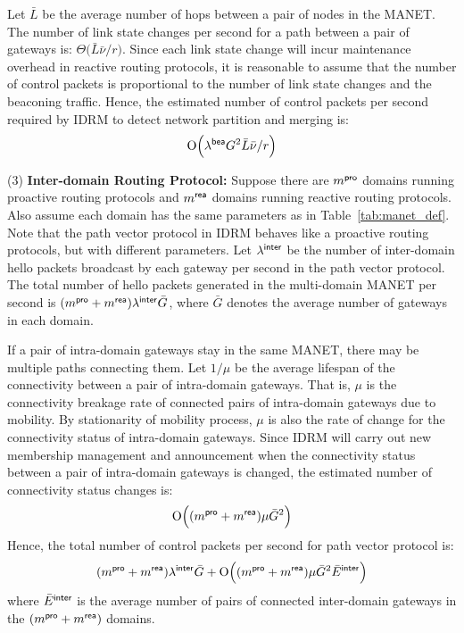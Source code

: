 Let $\bar{L}$ be the average number of hops between a pair of nodes in the MANET. The number of link state changes per second for a path between a pair of gateways is: 
$\Theta \big(\bar{L} \bar{\nu}\slash r\big)$.
Since each link state change will incur maintenance overhead in
reactive routing protocols, it is reasonable to assume that the number
of control packets is proportional to the number of link state changes and
the beaconing traffic.  Hence, the estimated number of control packets
per second required by IDRM to detect network partition and merging is: %
\begin{equation} \label{eq:rea-oh} 
{\rm O}\Big(\lambda^{\sf bea} {G}^2 \bar{L} \bar{\nu}\slash r\Big) %
\end{equation}



(3) {\bf Inter-domain Routing Protocol:}
Suppose there are $m^{\sf pro}$ domains running proactive routing
protocols and $m^{\sf rea}$ domains running reactive routing
protocols. Also assume each domain has the same parameters as in
Table~\ref{tab:manet_def}.
Note that the path vector protocol in IDRM behaves like a proactive routing
protocols, but with different parameters. Let $\lambda^{\sf inter}$
be the number of inter-domain hello packets broadcast by each gateway
per second in the path vector protocol. The total number of hello
packets generated in the multi-domain MANET per second is
$(m^{\sf pro} + m^{\sf rea})  \lambda^{\sf inter}  {\bar{G}}$,
where $\bar{G}$ denotes the average number of gateways in each domain.

If a pair of intra-domain gateways stay in the same MANET, there may be multiple
paths connecting them.  Let $1\slash\mu$ be the average lifespan of
the connectivity between a pair of intra-domain gateways. That is,
${\mu}$ is the connectivity breakage rate of connected pairs of intra-domain
gateways due to mobility. By stationarity of mobility process, ${\mu}$
is also the rate of change for the connectivity status of intra-domain
gateways.  Since IDRM will carry out new membership management and
announcement when the connectivity status between a pair of
intra-domain gateways is changed, the estimated number of connectivity
status changes is: %
\[ 
{\rm O}\Big((m^{\sf pro} + m^{\sf rea}) {\mu}  {\bar{G}}^2 \Big) %
\]
Hence, the total number of control packets per second for path vector protocol is: %
\begin{equation} \label{eq:pv-oh} 
 (m^{\sf pro} + m^{\sf rea}) \lambda^{\sf inter}   {\bar{G}} + {\rm O}\Big( (m^{\sf pro} + m^{\sf rea}) {\mu}   {\bar{G}}^2   \bar{E}^{\sf inter} \Big) %
\end{equation}
where $\bar{E}^{\sf inter}$ is the average number of pairs 
of connected inter-domain gateways in the $(m^{\sf pro} + m^{\sf rea})$ domains. 

